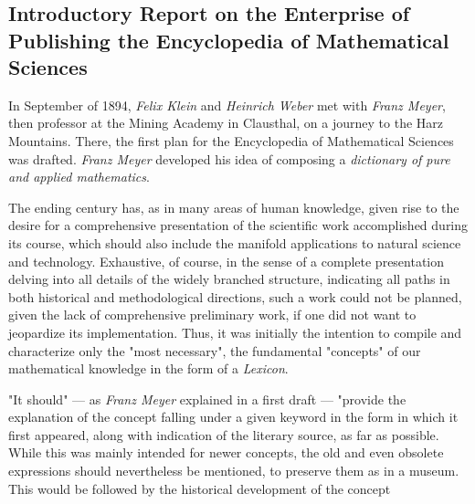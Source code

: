 \chapter*{}

\section*{Introductory Report on the Enterprise of Publishing the Encyclopedia of Mathematical Sciences}

In September of 1894, \textit{Felix Klein} and \textit{Heinrich Weber} met with \textit{Franz Meyer}, then professor at the Mining Academy in Clausthal, on a journey to the Harz Mountains. There, the first plan for the Encyclopedia of Mathematical Sciences was drafted. \textit{Franz Meyer} developed his idea of composing a \textit{dictionary of pure and applied mathematics}.

The ending century has, as in many areas of human knowledge, given rise to the desire for a comprehensive presentation of the scientific work accomplished during its course, which should also include the manifold applications to natural science and technology. Exhaustive, of course, in the sense of a complete presentation delving into all details of the widely branched structure, indicating all paths in both historical and methodological directions, such a work could not be planned, given the lack of comprehensive preliminary work, if one did not want to jeopardize its implementation. Thus, it was initially the intention to compile and characterize only the "most necessary", the fundamental "concepts" of our mathematical knowledge in the form of a \textit{Lexicon}.

"It should" — as \textit{Franz Meyer} explained in a first draft — "provide the explanation of the concept falling under a given keyword in the form in which it first appeared, along with indication of the literary source, as far as possible. While this was mainly intended for newer concepts, the old and even obsolete expressions should nevertheless be mentioned, to preserve them as in a museum. This would be followed by the historical development of the concept
